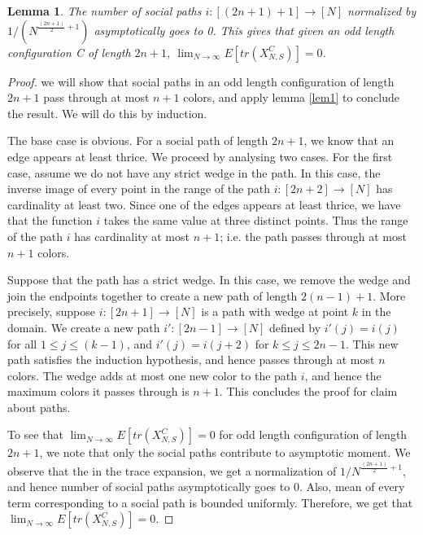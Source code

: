\documentclass[12pt]{amsart}
\newtheorem{lemma}[thm]{Lemma}
\theoremstyle{definition}
\theoremstyle{remark}
\newcommand\blue{\color{blue}}
\begin{document}
\begin{lemma} \label{lem2}
   The number of social paths $i:[(2n+1)+1] \to [N]$ normalized by ${1}/{(N^{\frac{(2n+1)}{2} + 1})}$ asymptotically goes to 0. This gives that given an odd length configuration C of length $2n+1$, $\lim_{N \to \infty} E[tr(X_{N,S}^C)] = 0$.
\end{lemma}

\begin{proof}

 we will show that social paths in an odd length configuration of length $2n+1$ pass through at most $n+1 $ colors, and apply lemma \ref{lem1} to conclude the result. We will do this by induction.

The base case is obvious. For a social path of length $2n+1$, we know that an edge appears at least thrice. We proceed by analysing two cases. For the first case, assume we do not have any strict wedge in the path. In this case, the inverse image of every point in the range of the path $i:[2n+2] \to [N]$ has cardinality at least two. Since one of the edges appears at least thrice, we have that the function $i$ takes the same value at three distinct points. Thus the range of the path $i$ has cardinality at most $n+1$; i.e. the path passes through at most $n+1$ colors.

Suppose that the path has a strict wedge. In this case, we remove the wedge and join the endpoints together to create a new path of length $2(n-1)+1$. More precisely, suppose $i:[2n+1] \to [N]$ is a path with wedge at point $k$ in the domain. We create a new path $i':[2n-1] \to [N]$ defined by $i'(j)=i(j)$ for all $1 \leq j \leq (k-1)$, and $i'(j)=i(j+2)$ for $k \leq j \leq 2n-1$. This new path satisfies the induction hypothesis, and hence passes through at most $n$ colors. The wedge adds at most one new color to the path $i$, and hence the maximum colors it passes through is $n+1$. This concludes the proof for claim about paths. \par

To see that $\lim_{N \to \infty} E[tr(X_{N,S}^C)] = 0$ for odd length configuration of length $2n+1$, we note that only the social paths contribute to asymptotic moment. We observe that the in the trace expansion, we get a normalization of ${1}/{N^{\frac{(2n+1)}{2} + 1}}$, and hence number of social paths asymptotically goes to 0. Also, mean of every term corresponding to a social path is bounded uniformly. Therefore, we get that $\lim_{N \to \infty} E[tr(X_{N,S}^C)] = 0$.


\end{proof}
\end{document}

